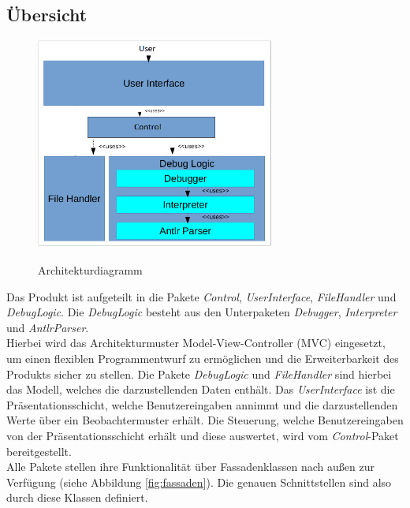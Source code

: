 \documentclass[parskip=full]{scrartcl}
\begin{document}
\subsection{Übersicht}

\begin{figure}[!h]
\centering
\includegraphics[width=0.7\textwidth]{../Plichtenheft/Architektur.png} \\
\caption{Architekturdiagramm}
\end{figure}
Das Produkt ist aufgeteilt in die Pakete \textit{Control}, \textit{UserInterface}, \textit{FileHandler} und \textit{DebugLogic}.
Die \textit{DebugLogic} besteht aus den Unterpaketen \textit{Debugger}, \textit{Interpreter} und
\textit{AntlrParser}.\\
Hierbei wird das Architekturmuster Model-View-Controller (MVC) eingesetzt, um einen flexiblen Programmentwurf zu ermöglichen und die Erweiterbarkeit des Produkts sicher zu stellen. Die Pakete \textit{DebugLogic} und \textit{FileHandler} sind hierbei das Modell, welches die darzustellenden Daten enthält. Das \textit{UserInterface} ist die Präsentationsschicht, welche Benutzereingaben annimmt und die darzustellenden Werte über ein Beobachtermuster erhält. Die Steuerung, welche Benutzereingaben von der Präsentationsschicht erhält und diese auswertet, wird vom \textit{Control}-Paket bereitgestellt. \\
Alle Pakete stellen ihre Funktionalität über Fassadenklassen nach außen zur Verfügung (siehe Abbildung \ref{fig:fassaden}). Die genauen Schnittstellen sind also durch diese Klassen definiert.

\newpage
\end{document}
